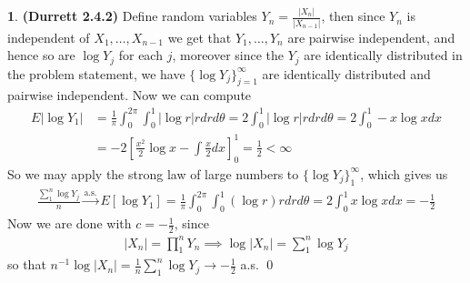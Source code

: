 \documentclass[10.5pt]{article}
\theoremstyle{definition}
\newtheorem{pb}{}
\newcommand{\set}[1]{\{#1\}}
\newcommand{\abs}[1]{\lvert#1\rvert}
\begin{document}
    \begin{pb}\textbf{(Durrett 2.4.2)}
        Define random variables \(Y_n = \frac{\abs{X_n}}{\abs{X_{n-1}}}\), then since \(Y_n\) is independent of \(X_1,\hdots,X_{n-1}\) we get that \(Y_1,\hdots,Y_n\) are pairwise independent, and hence so are \(\log Y_j\) for each \(j\), moreover since the \(Y_j\) are identically distributed in the problem statement, we have \(\set{\log Y_j}_{j=1}^\infty\) are identically distributed and pairwise independent. Now we can compute
        \begin{align*}
            E\abs{\log Y_1} &= \frac{1}{\pi}\int_0^{2\pi}\int_0^1 \abs{\log r}rdrd\theta = 2\int_0^1 \abs{\log r}rdrd\theta = 2\int_0^1 -x\log x dx \\
            &= -2 \left[\frac{x^2}{2}\log x - \int \frac{x}{2}dx\right]_0^1 = \frac{1}{2} < \infty
        \end{align*}
        So we may apply the strong law of large numbers to \(\set{\log Y_j}_1^\infty\), which gives us
        \begin{align*}
            \frac{\sum_1^n \log Y_j}{n} \overset{\text{a.s.}}{\longrightarrow} E[\log Y_1] = \frac{1}{\pi}\int_0^{2\pi}\int_0^1 (\log r) r drd\theta = 2\int_0^1 x\log x dx = -\frac12
        \end{align*}
        Now we are done with \(c = -\frac12\), since
        \begin{align*}
            \abs{X_n} = \prod_1^n Y_n \implies \log \abs{X_n} = \sum_1^n \log Y_j
        \end{align*}
        so that \(n^{-1}\log \abs{X_n} = \frac{1}{n}\sum_1^n \log Y_j \to -\frac12\) a.s. \qed 
    \end{pb}
\end{document}

